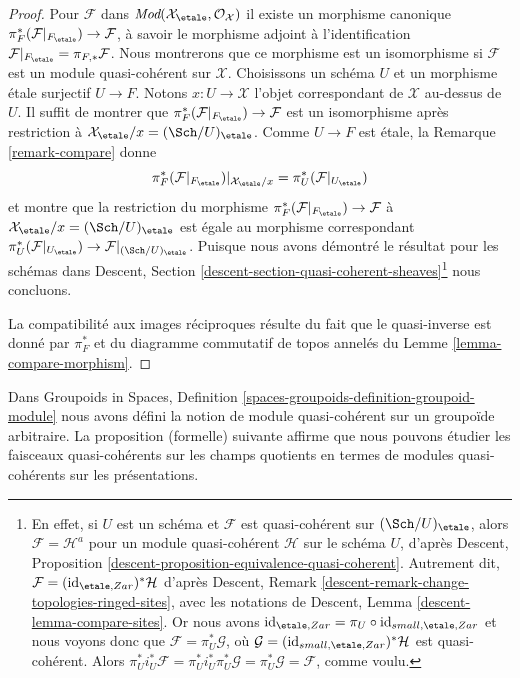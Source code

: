 \begin{proof}
\medskip\noindent
Pour $\mathcal{F}$ dans
$\textit{Mod}(\mathcal{X}_\etale, \mathcal{O}_\mathcal{X})$
il existe un morphisme canonique $\pi_F^*(\mathcal{F}|_{F_\etale}) \to \mathcal{F}$,
à savoir le morphisme adjoint à l'identification
$\mathcal{F}|_{F_\etale} = \pi_{F, *}\mathcal{F}$.
Nous montrerons que ce morphisme est un isomorphisme si $\mathcal{F}$ est
un module quasi-cohérent sur $\mathcal{X}$.
Choisissons un schéma $U$ et un morphisme étale surjectif $U \to F$.
Notons $x : U \to \mathcal{X}$ l'objet correspondant de $\mathcal{X}$
au-dessus de $U$. Il suffit de montrer que
$\pi_F^*(\mathcal{F}|_{F_\etale}) \to \mathcal{F}$ est un isomorphisme
après restriction à $\mathcal{X}_\etale/x = (\Sch/U)_\etale$.
Comme $U \to F$ est étale, la Remarque \ref{remark-compare} donne
$$
\pi_F^*(\mathcal{F}|_{F_\etale})|_{\mathcal{X}_\etale/x} =
\pi_U^*(\mathcal{F}|_{U_\etale})
$$
et montre que la restriction du morphisme
$\pi_F^*(\mathcal{F}|_{F_\etale}) \to \mathcal{F}$
à $\mathcal{X}_\etale/x = (\Sch/U)_\etale$
est égale au morphisme correspondant
$\pi_U^*(\mathcal{F}|_{U_\etale}) \to \mathcal{F}|_{(\Sch/U)_\etale}$.
Puisque nous avons démontré le résultat pour les schémas dans
Descent, Section \ref{descent-section-quasi-coherent-sheaves}\footnote{En effet,
si $U$ est un schéma et $\mathcal{F}$ est quasi-cohérent sur
$(\Sch/U)_\etale$, alors $\mathcal{F} = \mathcal{H}^a$ pour un
module quasi-cohérent $\mathcal{H}$ sur le schéma $U$, d'après
Descent, Proposition \ref{descent-proposition-equivalence-quasi-coherent}.
Autrement dit, $\mathcal{F} = (\text{id}_{\etale,Zar})^*\mathcal{H}$
d'après Descent, Remark \ref{descent-remark-change-topologies-ringed-sites},
avec les notations de Descent, Lemma \ref{descent-lemma-compare-sites}.
Or nous avons
$\text{id}_{\etale,Zar} = \pi_U \circ \text{id}_{small,\etale,Zar}$
et nous voyons donc que $\mathcal{F} = \pi_U^*\mathcal{G}$, où
$\mathcal{G} = (\text{id}_{small,\etale,Zar})^*\mathcal{H}$ est
quasi-cohérent. Alors
$\pi_U^*i_U^*\mathcal{F} = \pi_U^*i_U^*\pi_U^*\mathcal{G} =
\pi_U^*\mathcal{G} = \mathcal{F}$, comme voulu.}
nous concluons.

\medskip\noindent
La compatibilité aux images réciproques résulte du fait que
le quasi-inverse est donné par $\pi_F^*$ et du
diagramme commutatif de topos annelés du
Lemme \ref{lemma-compare-morphism}.
\end{proof}

\noindent
Dans
Groupoids in Spaces, Definition
\ref{spaces-groupoids-definition-groupoid-module}
nous avons défini la notion de module quasi-cohérent
sur un groupoïde arbitraire. La proposition (formelle) suivante affirme
que nous pouvons étudier les faisceaux quasi-cohérents sur les champs quotients
en termes de modules quasi-cohérents sur les présentations.

